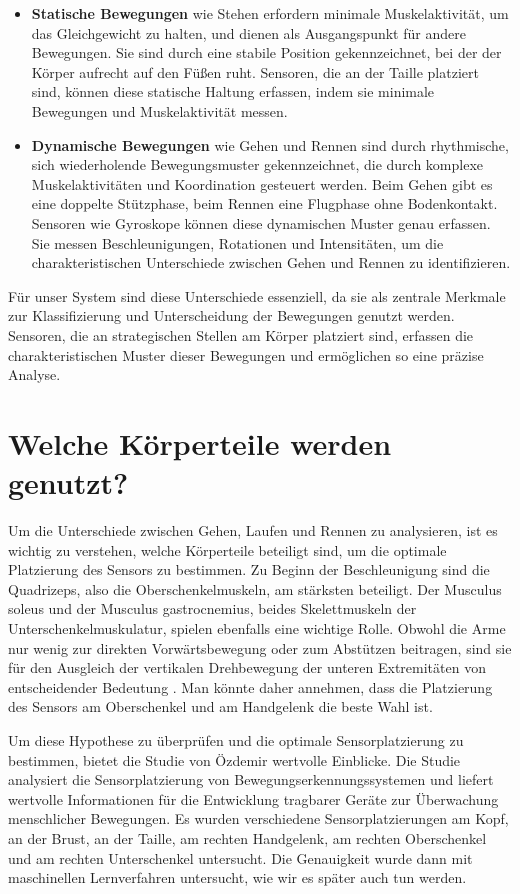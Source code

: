 \begin{itemize}
	\item \textbf{Statische Bewegungen} wie Stehen erfordern minimale Muskelaktivität, um das Gleichgewicht zu halten, und dienen als Ausgangspunkt für andere Bewegungen. Sie sind durch eine stabile Position gekennzeichnet, bei der der Körper aufrecht auf den Füßen ruht. Sensoren, die an der Taille platziert sind, können diese statische Haltung erfassen, indem sie minimale Bewegungen und Muskelaktivität messen.
	\item \textbf{Dynamische Bewegungen} wie Gehen und Rennen sind durch rhythmische, sich wiederholende Bewegungsmuster gekennzeichnet, die durch komplexe Muskelaktivitäten und Koordination gesteuert werden. Beim Gehen gibt es eine doppelte Stützphase, beim Rennen eine Flugphase ohne Bodenkontakt. Sensoren wie Gyroskope können diese dynamischen Muster genau erfassen. Sie messen Beschleunigungen, Rotationen und Intensitäten, um die charakteristischen Unterschiede zwischen Gehen und Rennen zu identifizieren.
\end{itemize}

Für unser System sind diese Unterschiede essenziell, da sie als zentrale Merkmale zur Klassifizierung und Unterscheidung der Bewegungen genutzt werden. Sensoren, die an strategischen Stellen am Körper platziert sind, erfassen die charakteristischen Muster dieser Bewegungen und ermöglichen so eine präzise Analyse.

\section{Welche Körperteile werden genutzt?}
Um die Unterschiede zwischen Gehen, Laufen und Rennen zu analysieren, ist es wichtig zu verstehen, welche Körperteile beteiligt sind, um die optimale Platzierung des Sensors zu bestimmen. Zu Beginn der Beschleunigung sind die Quadrizeps, also die Oberschenkelmuskeln, am stärksten beteiligt. Der Musculus soleus und der Musculus gastrocnemius, beides Skelettmuskeln der Unterschenkelmuskulatur, spielen ebenfalls eine wichtige Rolle. Obwohl die Arme nur wenig zur direkten Vorwärtsbewegung oder zum Abstützen beitragen, sind sie für den Ausgleich der vertikalen Drehbewegung der unteren Extremitäten von entscheidender Bedeutung \cite{hamner2010muscle}. Man könnte daher annehmen, dass die Platzierung des Sensors am Oberschenkel und am Handgelenk die beste Wahl ist.

Um diese Hypothese zu überprüfen und die optimale Sensorplatzierung zu bestimmen, bietet die Studie von Özdemir \cite{ozdemir2016analysis} wertvolle Einblicke. Die Studie analysiert die Sensorplatzierung von Bewegungserkennungssystemen und liefert wertvolle Informationen für die Entwicklung tragbarer Geräte zur Überwachung menschlicher Bewegungen. Es wurden verschiedene Sensorplatzierungen am Kopf, an der Brust, an der Taille, am rechten Handgelenk, am rechten Oberschenkel und am rechten Unterschenkel untersucht. Die Genauigkeit wurde dann mit maschinellen Lernverfahren untersucht, wie wir es später auch tun werden.

